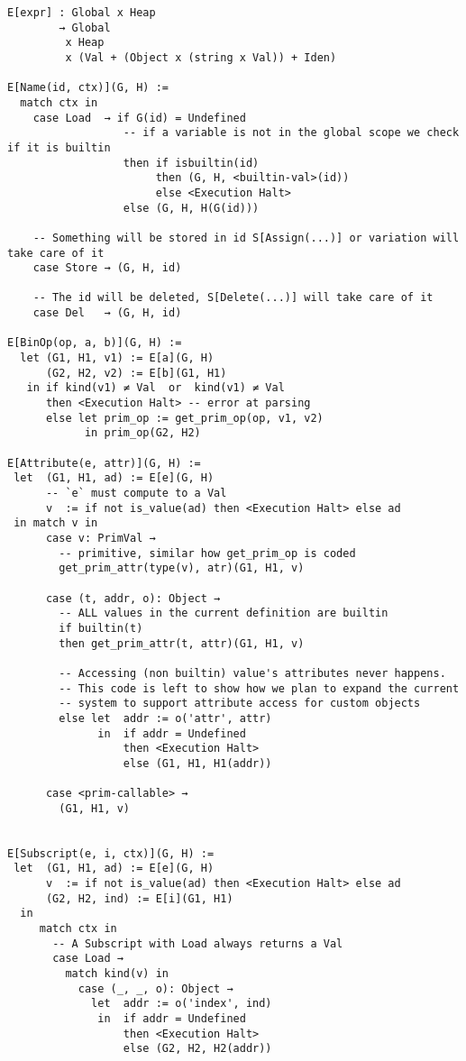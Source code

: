 \begin{verbatim}
E[expr] : Global x Heap
        → Global
         x Heap
         x (Val + (Object x (string x Val)) + Iden)

E[Name(id, ctx)](G, H) :=
  match ctx in
    case Load  → if G(id) = Undefined
                  -- if a variable is not in the global scope we check if it is builtin
                  then if isbuiltin(id)
                       then (G, H, <builtin-val>(id))
                       else <Execution Halt>
                  else (G, H, H(G(id)))

    -- Something will be stored in id S[Assign(...)] or variation will take care of it
    case Store → (G, H, id)

    -- The id will be deleted, S[Delete(...)] will take care of it
    case Del   → (G, H, id)

E[BinOp(op, a, b)](G, H) :=
  let (G1, H1, v1) := E[a](G, H)
      (G2, H2, v2) := E[b](G1, H1)
   in if kind(v1) ≠ Val  or  kind(v1) ≠ Val
      then <Execution Halt> -- error at parsing
      else let prim_op := get_prim_op(op, v1, v2)
            in prim_op(G2, H2)

E[Attribute(e, attr)](G, H) :=
 let  (G1, H1, ad) := E[e](G, H)
      -- `e` must compute to a Val
      v  := if not is_value(ad) then <Execution Halt> else ad
 in match v in
      case v: PrimVal →
        -- primitive, similar how get_prim_op is coded
        get_prim_attr(type(v), atr)(G1, H1, v)

      case (t, addr, o): Object →
        -- ALL values in the current definition are builtin
        if builtin(t)
        then get_prim_attr(t, attr)(G1, H1, v)

        -- Accessing (non builtin) value's attributes never happens.
        -- This code is left to show how we plan to expand the current
        -- system to support attribute access for custom objects
        else let  addr := o('attr', attr)
              in  if addr = Undefined
                  then <Execution Halt>
                  else (G1, H1, H1(addr))

      case <prim-callable> →
        (G1, H1, v)


E[Subscript(e, i, ctx)](G, H) :=
 let  (G1, H1, ad) := E[e](G, H)
      v  := if not is_value(ad) then <Execution Halt> else ad
      (G2, H2, ind) := E[i](G1, H1)
  in
     match ctx in
       -- A Subscript with Load always returns a Val
       case Load →
         match kind(v) in
           case (_, _, o): Object →
             let  addr := o('index', ind)
              in  if addr = Undefined
                  then <Execution Halt>
                  else (G2, H2, H2(addr))


\end{verbatim}
